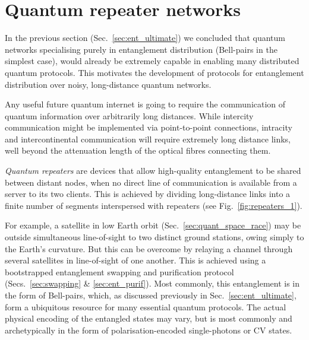 %
%

\section{Quantum repeater networks} \label{sec:rep_net} 

In the previous section (Sec.~\ref{sec:ent_ultimate}) we concluded that quantum networks specialising purely in entanglement distribution (Bell-pairs in the simplest case), would already be extremely capable in enabling many distributed quantum protocols. This motivates the development of protocols for entanglement distribution over noisy, long-distance quantum networks.

Any useful future quantum internet is going to require the communication of quantum information over arbitrarily long distances. While intercity communication might be implemented via point-to-point connections, intracity and intercontinental communication will require extremely long distance links, well beyond the attenuation length of the optical fibres connecting them.

\textit{Quantum repeaters} \cite{bib:Gisin2007, bib:SSRG09, bib:WJM2015} are devices that allow high-quality entanglement to be shared between distant nodes, when no direct line of communication is available from a server to its two clients. This is achieved by dividing long-distance links into a finite number of segments interspersed with repeaters (see Fig.~\ref{fig:repeaters_1}).

 For example, a satellite in low Earth orbit (Sec.~\ref{sec:quant_space_race}) may be outside simultaneous line-of-sight to two distinct ground stations, owing simply to the Earth's curvature. But this can be overcome by relaying a channel through several satellites in line-of-sight of one another. This is achieved using a bootstrapped entanglement swapping and purification protocol (Secs.~\ref{sec:swapping} \& \ref{sec:ent_purif}). Most commonly, this entanglement is in the form of Bell-pairs, which, as discussed previously in Sec.~\ref{sec:ent_ultimate}, form a ubiquitous resource for many essential quantum protocols. The actual physical encoding of the entangled states may vary, but is most commonly and archetypically in the form of polarisation-encoded single-photons or CV states.
 
